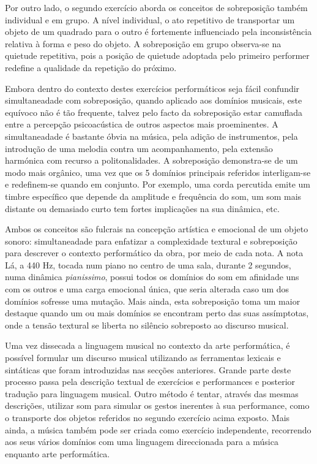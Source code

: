 \documentclass[../main.tex]{subfiles}
\begin{document}
Por outro lado, o segundo exercício aborda os conceitos de sobreposição também individual e em grupo. A nível individual, o ato repetitivo de transportar um objeto de um quadrado para o outro é fortemente influenciado pela inconsistência relativa à forma e peso do objeto. A sobreposição em grupo observa-se na quietude repetitiva, pois a posição de quietude adoptada pelo primeiro performer redefine a qualidade da repetição do próximo.

Embora dentro do contexto destes exercícios performáticos seja fácil confundir simultaneadade com sobreposição, quando aplicado aos domínios musicais, este equívoco não é tão frequente, talvez pelo facto da sobreposição estar camuflada entre a percepção psicoacústica de outros aspectos mais proeminentes. A simultaneadade é bastante óbvia na música, pela adição de instrumentos, pela introdução de uma melodia contra um acompanhamento, pela extensão harmónica com recurso a politonalidades. A sobreposição demonstra-se de um modo mais orgânico, uma vez que os 5 domínios principais referidos interligam-se e redefinem-se quando em conjunto. Por exemplo, uma corda percutida emite um timbre específico que depende da amplitude e frequência do som\cite{benade}, um som mais distante ou demasiado curto tem fortes implicações na sua dinâmica, etc.

Ambos os conceitos são fulcrais na concepção artística e emocional de um objeto sonoro: simultaneadade para enfatizar a complexidade textural e sobreposição para descrever o contexto performático da obra, por meio de cada nota. A nota Lá, a 440 Hz, tocada num piano no centro de uma sala, durante 2 segundos, numa dinâmica \textsl{pianissimo}, possui todos os domínios do som em afinidade uns com os outros e uma carga emocional única, que seria alterada caso um dos domínios sofresse uma mutação. Mais ainda, esta sobreposição toma um maior destaque quando um ou mais domínios se encontram perto das suas assímptotas, onde a tensão textural se liberta no silêncio sobreposto ao discurso musical.


Uma vez dissecada a linguagem musical no contexto da arte performática, é possível formular um discurso musical utilizando as ferramentas lexicais e sintáticas que foram introduzidas nas secções anteriores. Grande parte deste processo passa pela descrição textual de exercícios e performances e posterior tradução para linguagem musical. Outro método é tentar, através das mesmas descrições, utilizar som para simular os gestos inerentes à sua performance, como o transporte dos objetos referidos no segundo exercício acima exposto. Mais ainda, a música também pode ser criada como exercício independente, recorrendo aos seus vários domínios com uma linguagem direccionada para a música enquanto arte performática.
\end{document}
